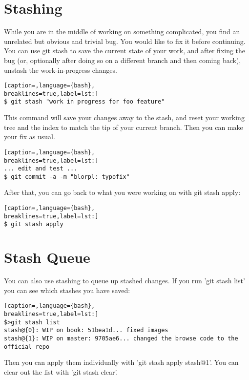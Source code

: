 \section{Stashing}
While you are in the middle of working on something complicated, you find an
unrelated but obvious and trivial bug. You would like to fix it before
continuing. You can use git stash to save the current state of your work, and
after fixing the bug (or, optionally after doing so on a different branch and
then coming back), unstash the work-in-progress changes.
\lstset{basicstyle=\scriptsize, numbers=none, captionpos=b, tabsize=4}
\begin{lstlisting}[caption=,language={bash},
breaklines=true,label=lst:]
$ git stash "work in progress for foo feature"
\end{lstlisting}

This command will save your changes away to the stash, and reset your working
tree and the index to match the tip of your current branch. Then you can make
your fix as usual.
\lstset{basicstyle=\scriptsize, numbers=none, captionpos=b, tabsize=4}
\begin{lstlisting}[caption=,language={bash},
breaklines=true,label=lst:]
... edit and test ...
$ git commit -a -m "blorpl: typofix"
\end{lstlisting}

After that, you can go back to what you were working on with git stash apply:
\lstset{basicstyle=\scriptsize, numbers=none, captionpos=b, tabsize=4}
\begin{lstlisting}[caption=,language={bash},
breaklines=true,label=lst:]
$ git stash apply
\end{lstlisting}

\section{Stash Queue}
You can also use stashing to queue up stashed changes.  If you run 'git stash
list' you can see which stashes you have saved:
\lstset{basicstyle=\scriptsize, numbers=none, captionpos=b, tabsize=4}
\begin{lstlisting}[caption=,language={bash},
breaklines=true,label=lst:]
$>git stash list
stash@{0}: WIP on book: 51bea1d... fixed images
stash@{1}: WIP on master: 9705ae6... changed the browse code to the official repo
\end{lstlisting}

Then you can apply them individually with 'git stash apply stash@{1}'. You can
clear out the list with 'git stash clear'.
